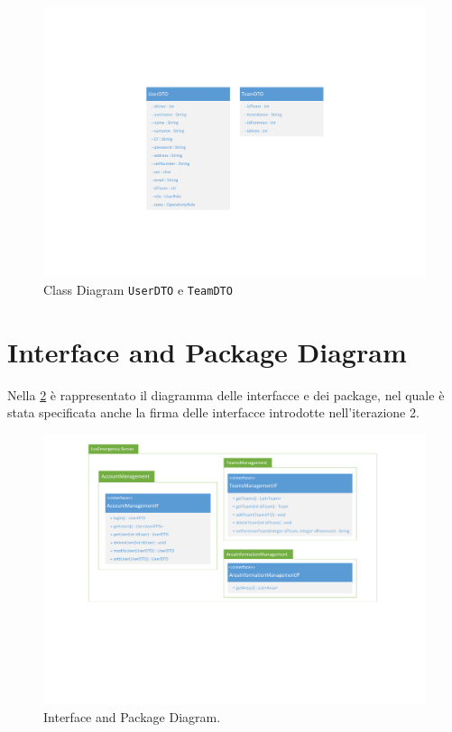 \begin{figure}[h!]
	\centering
	\includegraphics[width=1\linewidth]{./Iterazione 3/OtherFiles/DTOSpecification}
	\caption{Class Diagram \texttt{UserDTO} e \texttt{TeamDTO}}
	\label{fig:ClassDiagramDTO_iterazione2}
\end{figure}

\clearpage

\section{Interface and Package Diagram}
Nella \Fig\ref{fig:InterfaceDiagram_iterazione2} è rappresentato il diagramma delle interfacce e dei package, nel quale è stata specificata anche la firma delle interfacce introdotte nell'iterazione 2.

\begin{figure}[h]
	\centering
	\includegraphics[width=1\linewidth]{./Iterazione 2/OtherFiles/UML - Interface Diagram}
	\caption{Interface and Package Diagram.}
	\label{fig:InterfaceDiagram_iterazione2}
\end{figure}
